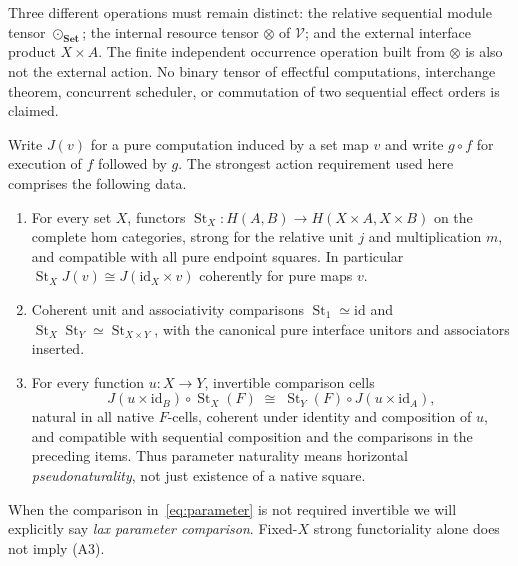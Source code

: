 \documentclass[11pt,a4paper]{article}
\theoremstyle{definition}
\newcommand{\Set}{\mathbf{Set}}
\newcommand{\V}{\mathcal V}
\newcommand{\id}{\mathrm{id}}
\newcommand{\st}{\operatorname{St}}
\begin{document}
Three different operations must remain distinct: the relative sequential
module tensor $\odot_{\Set}$; the internal resource tensor $\otimes$ of $\V$;
and the external interface product $X\times A$. The finite independent
occurrence operation built from $\otimes$ is also not the external action.
No binary tensor of effectful computations, interchange theorem, concurrent
scheduler, or commutation of two sequential effect orders is claimed.

Write $J(v)$ for a pure computation induced by a set map $v$ and write
$g\circ f$ for execution of $f$ followed by $g$. The strongest action
requirement used here comprises the following data.
\begin{enumerate}[label=\textup{(A\arabic*)}]
\item For every set $X$, functors
$\st_X:H(A,B)\to H(X\times A,X\times B)$ on the complete hom categories,
strong for the relative unit $j$ and multiplication $m$, and compatible with
all pure endpoint squares. In particular
$\st_XJ(v)\cong J(\id_X\times v)$ coherently for pure maps $v$.
\item Coherent unit and associativity comparisons
$\st_1\simeq\id$ and $\st_X\st_Y\simeq\st_{X\times Y}$, with the
canonical pure interface unitors and associators inserted.
\item For every function $u:X\to Y$, invertible comparison cells
\begin{equation}\label{eq:parameter}
 J(u\times\id_B)\circ\st_X(F)
 \;\cong\;\st_Y(F)\circ J(u\times\id_A),
\end{equation}
natural in all native $F$-cells, coherent under identity and composition
of $u$, and compatible with sequential composition and the comparisons
in the preceding items. Thus parameter naturality means horizontal
\emph{pseudonaturality}, not just existence of a native square.
\end{enumerate}
When the comparison in~\eqref{eq:parameter} is not required invertible we
will explicitly say \emph{lax parameter comparison}. Fixed-$X$ strong
functoriality alone does not imply (A3).
\end{document}
